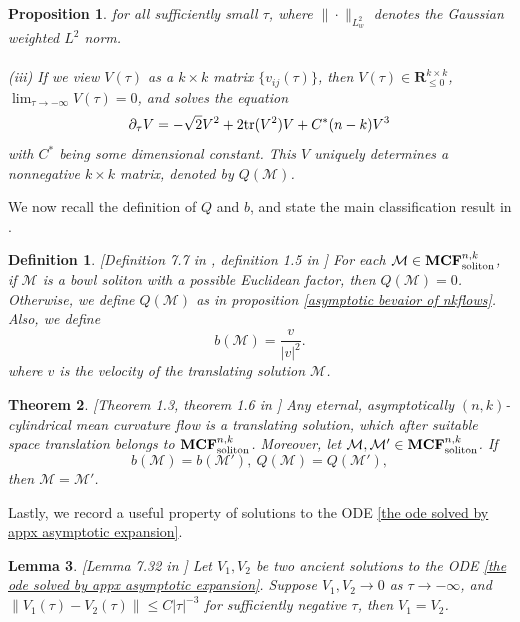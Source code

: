 \documentclass[pdflatex,sn-mathphys-num]{sn-jnl}%
\newtheorem{theorem}{Theorem}[section]
\newtheorem{definition}{Definition}[section]
\newtheorem{lemma}[theorem]{Lemma}
\newtheorem{Proposition}[theorem]{Proposition}
\begin{document}
\begin{Proposition}
for all sufficiently small $\tau$, where $\|\cdot\|_{L^2_{w}}$ denotes the Gaussian weighted $L^2$ norm. \\\\
(iii) If we view $V(\tau)$ as a $k\times k$ matrix $\{v_{ij}(\tau)\}$, then $V(\tau) \in \mathbf{R}^{k\times k}_{\leq 0}$, $\lim_{\tau \to -\infty}V(\tau) = 0$, and solves the equation
\begin{equation}\label{the ode solved by appx asymptotic expansion}
   \partial_{\tau}V = -\sqrt{2}V^2 + 2\textup{tr}(V^2)V + C^*(n-k)V^3
\end{equation}
with $C^*$ being some dimensional constant. This $V$ uniquely determines a nonnegative $k\times k$ matrix, denoted by $Q(\mathcal{M})$. 
\end{Proposition}
We now recall the definition of $Q$ and $b$, and state the main classification result in \cite{Bamler2025-thclassification}.
\begin{definition}\label{definition of parameter Q,b in bamler lai}[Definition 7.7 in \cite{Bamler2025-pdeodi}, definition 1.5 in \cite{Bamler2025-thclassification}]
For each $\mathcal{M} \in \textup{\textbf{MCF}}^{n,k}_{\textup{soliton}}$, if $\mathcal{M}$ is a bowl soliton with a possible Euclidean factor, then $Q(\mathcal{M}) = 0$. Otherwise, we define $Q(\mathcal{M})$ as in proposition \ref{asymptotic bevaior of nkflows}. Also, we define
    \begin{equation}
        b(\mathcal{M}) = \frac{v}{|v|^2}.
    \end{equation}
    where $v$ is the velocity of the translating solution $\mathcal{M}$. 
\end{definition}
\begin{theorem}\label{parametrization of space of solitons by bamler lai}[Theorem 1.3, theorem 1.6 in \cite{Bamler2025-thclassification}]
Any eternal, asymptotically $(n,k)$-cylindrical mean curvature flow is a translating solution, which after suitable space translation belongs to $\textup{\textbf{MCF}}^{n,k}_{\textup{soliton}}$. Moreover, let $\mathcal{M}, \mathcal{M}' \in \textup{\textbf{MCF}}^{n,k}_{\textup{soliton}}$. If
\begin{equation}
    b(\mathcal{M}) = b(\mathcal{M}'), \ Q(\mathcal{M}) = Q(\mathcal{M}'),
\end{equation}
then $\mathcal{M} = \mathcal{M}'$.
\end{theorem}
Lastly, we record a useful property of solutions to the ODE \eqref{the ode solved by appx asymptotic expansion}.
\begin{lemma}\label{key property of ODE solution}[Lemma 7.32 in \cite{Bamler2025-pdeodi}]
    Let $V_1, V_2$ be two ancient solutions to the ODE \eqref{the ode solved by appx asymptotic expansion}. Suppose $V_1, V_2 \to 0$ as $\tau \to -\infty$, and $\|V_1(\tau) - V_2(\tau)\|\leq C|\tau|^{-3}$ for sufficiently negative $\tau$, then $V_1 = V_2$.
\end{lemma}
\end{document}
